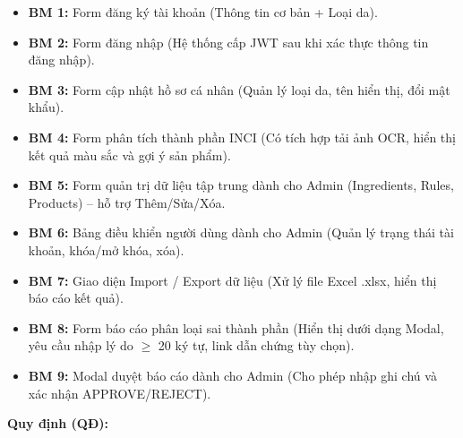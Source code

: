 \documentclass[12pt,a4paper]{article}
\begin{document}
\begin{itemize}
    \item \textbf{BM 1:} Form đăng ký tài khoản (Thông tin cơ bản + Loại da).
    \item \textbf{BM 2:} Form đăng nhập (Hệ thống cấp JWT sau khi xác thực thông tin đăng nhập).
    \item \textbf{BM 3:} Form cập nhật hồ sơ cá nhân (Quản lý loại da, tên hiển thị, đổi mật khẩu).
    \item \textbf{BM 4:} Form phân tích thành phần INCI (Có tích hợp tải ảnh OCR, hiển thị kết quả màu sắc và gợi ý sản phẩm).
    \item \textbf{BM 5:} Form quản trị dữ liệu tập trung dành cho Admin (Ingredients, Rules, Products) – hỗ trợ Thêm/Sửa/Xóa.
    \item \textbf{BM 6:} Bảng điều khiển người dùng dành cho Admin (Quản lý trạng thái tài khoản, khóa/mở khóa, xóa).
    \item \textbf{BM 7:} Giao diện Import / Export dữ liệu (Xử lý file Excel .xlsx, hiển thị báo cáo kết quả).
    \item \textbf{BM 8:} Form báo cáo phân loại sai thành phần (Hiển thị dưới dạng Modal, yêu cầu nhập lý do $\ge$ 20 ký tự, link dẫn chứng tùy chọn).
    \item \textbf{BM 9:} Modal duyệt báo cáo dành cho Admin (Cho phép nhập ghi chú và xác nhận APPROVE/REJECT).
\end{itemize}

\textbf{Quy định (QĐ):}
\end{document}
